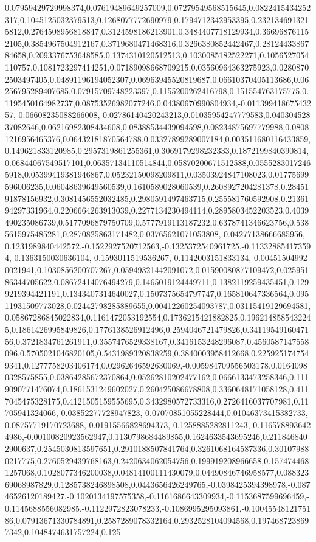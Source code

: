 0.07959429729998374,0.07619489649257009,0.07279549568515645,0.0822415434252317,0.1045125032379513,0.1268077772690979,0.1794712342953395,0.2321346913215812,0.2764508956818847,0.3124598186213901,0.3484407718129934,0.366968761152105,0.3854967504912167,0.3719680471468316,0.3266380852442467,0.2812443386784658,0.2093376753648585,0.1374310120512513,0.1030085182522271,0.1056527054110757,0.1081723297414251,0.07189098668709215,0.03560964363275923,0.02808702503497405,0.04891196194052307,0.06963945520819687,0.06610370405113686,0.06256795289407685,0.07915709748223397,0.1155200262416798,0.151554763175775,0.1195450164982737,0.08753526982077246,0.04380670990804934,-0.01139941867543257,-0.06608235088266008,-0.02786140420243213,0.01035954247779583,0.04030452837082646,0.06216982308434608,0.08388534439094598,0.08234875697779988,0.08081216956465376,0.06432181870564788,0.03327899289007184,0.003511680116433859,0.149621833120985,0.2957319861255361,0.3069179298232333,0.1872199840390814,0.06844067549517101,0.06357134110514844,0.05870200671512588,0.05552830172465918,0.05399419381946867,0.05232150098209811,0.03503924847108023,0.01775699596006235,0.06048639649560539,0.1610589028060539,0.2608927204281378,0.2845191878156932,0.3081456552032485,0.2980591497463715,0.255581760592908,0.2136194297331964,0.2206664263913039,0.2277134230494114,0.2895803452203523,0.4039490235086739,0.5177096879750709,0.5777919113187232,0.6378741346623756,0.5385615975485281,0.2870825863171482,0.03765621071053808,-0.04277138666685956,-0.1231989840442572,-0.1522927520712563,-0.1325372540961725,-0.113328854173594,-0.1363150030636104,-0.1593011519536267,-0.1142003151833134,-0.004515049920021941,0.1030856200707267,0.05949321442091072,0.01590080877109472,0.02595186344705622,0.08672414076494279,0.1465019124449711,0.1382119259435451,0.1299219394421191,0.1343407314640027,0.1507375654797747,0.165810647336564,0.09511931509773028,0.02442798285889655,0.00412260254093787,0.03115419129694581,0.05867286845022834,0.1161472053192554,0.1736215421882825,0.1962148585432245,0.1861426995849826,0.1776138526912496,0.2594046721479826,0.3411954916047156,0.3721834761261911,0.3557476529338167,0.3416153248296087,0.4560587147558096,0.5705021046820105,0.5431989320838259,0.3840003958412668,0.2259251747549341,0.1277758203406174,0.02962646592630069,-0.005984709556503178,0.01640980328575855,0.03864285672370864,0.05262810202477162,0.0666133473258346,0.1119090771476074,0.1861531249602027,0.260425086678808,0.3360648171058128,0.4117045475328175,0.4121505159555695,0.3432980572733316,0.2726416037707981,0.11705941324066,-0.03852277728947823,-0.07070851055228444,0.01046373415382733,0.08757719170723688,-0.01915566828694373,-0.1258885282811243,-0.1165788936424986,-0.00100820923562947,0.1130798684489855,0.1624633543695246,0.2118468402900637,0.2545030813597651,0.2910188507841764,0.3261068164587336,0.301079880217775,0.2760529439768163,0.2420634062054756,0.199919208966658,0.1574744681257068,0.1028077346200038,0.04814100111430079,0.04490846746958577,0.08832369068987829,0.1285738246898508,0.0443656426249765,-0.0398425394398978,-0.08746526120189427,-0.1020134197575358,-0.1161686643309934,-0.1153687599696459,-0.1145688556082985,-0.1122972823078233,-0.1086995295093861,-0.1004554812175186,0.07913671330784891,0.2587289078332164,0.2932528104094568,0.1974687238697342,0.1048474631757224,0.125